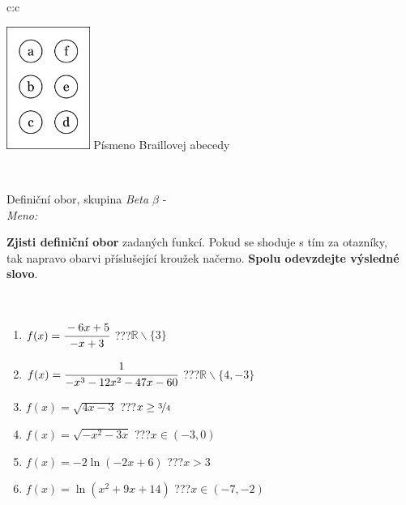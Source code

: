 \documentclass[10pt]{report}
\begin{document}
\begin{tabular}{c:c}
\begin{minipage}[c][104.5mm][t]{0.5\linewidth}
\begin{center}
\begin{minipage}{0.20\linewidth}
\begin{center}
\includegraphics[height=40mm]{../images/braille.png}
{\small Písmeno Braillovej abecedy}
\end{center}
\end{minipage}
\end{center}
\end{minipage}
\\ \hdashline
\begin{minipage}[c][104.5mm][t]{0.5\linewidth}
\begin{center}
\vspace{7mm}
{\huge Definiční obor, skupina \textit{Beta $\beta$} -}\\[5mm]
\textit{Meno:}\phantom{xxxxxxxxxxxxxxxxxxxxxxxxxxxxxxxxxxxxxxxxxxxxxxxxxxxxxxxxxxxxxxxxx}\\[5mm]
\begin{minipage}{0.95\linewidth}
\textbf{Zjisti definiční obor} zadaných funkcí. Pokud se shoduje s tím za otazníky,\\tak napravo obarvi příslušející kroužek načerno. \textbf{Spolu odevzdejte výsledné slovo}.
\end{minipage}
\\[1mm]
\begin{minipage}{0.79\linewidth}
\begin{center}
\begin{varwidth}{\linewidth}
\begin{enumerate}
\normalsizerrr
\item $f(x)=\cfrac{-6x+5}{-x+3}$\quad \dotfill\; ???\;\dotfill \quad $\mathbb{R}\smallsetminus\{3\}$
\item $f(x)=\cfrac{1}{-x^3-12x^2-47x-60}$\quad \dotfill\; ???\;\dotfill \quad $\mathbb{R}\smallsetminus\{4,-3\}$
\item $f(x)=\sqrt{4x-3}$\quad \dotfill\; ???\;\dotfill \quad $x\geq\nicefrac{3}{4}$
\item $f(x)=\sqrt{-x^2-3x}$\quad \dotfill\; ???\;\dotfill \quad $x\in(-3 , 0)$
\item $f(x)=-2\ln{(-2x+6)}$\quad \dotfill\; ???\;\dotfill \quad $x>3$
\item $f(x)=\ln{(x^2+9x+14)}$\quad \dotfill\; ???\;\dotfill \quad $x\in(-7 , -2)$

\end{enumerate}
\end{varwidth}
\end{center}
\end{minipage}
\end{center}
\end{minipage}
\end{tabular}
\end{document}
